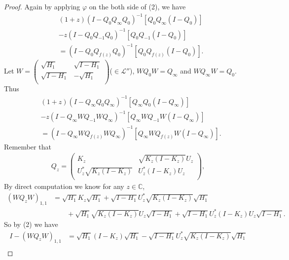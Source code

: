 \documentclass{amsart}
\newcommand{\LLL}{\mathcal L} %
\newcommand{\C}{\mathbb C} %
\begin{document}
\begin{proof}
Again by applying $\varphi$ on the both side of (2), we have
\begin{equation}\label{(*)}
\begin{split}
&(1+z)(I - Q_{0}Q_{\infty}Q_{0})^{-1}[Q_{0}Q_{\infty}(I-Q_{0})] \\
& - z(I - Q_{0}Q_{-1}Q_{0})^{-1}[Q_{0}Q_{-1}(I-Q_{0})] \\
&= (I - Q_{0}Q_{f(z)}Q_{0})^{-1}[Q_{0}Q_{f(z)}(I-Q_{0})].
\end{split}
\end{equation}
Let $W = \left(
           \begin{array}{cc}
             \sqrt{H_1} & \sqrt{I-H_1} \\
             \sqrt{I-H_1} & -\sqrt{H_1} \\
           \end{array}
         \right)$($\in \LLL''$), $WQ_{0}W = Q_{\infty}$ and $WQ_{\infty}W = Q_{0}$. Thus
\begin{equation}\label{(*)}
\begin{split}
&(1+z)(I - Q_{\infty}Q_{0}Q_{\infty})^{-1}[Q_{\infty}Q_{0}(I-Q_{\infty})] \\
& - z(I - Q_{\infty}WQ_{-1}WQ_{\infty})^{-1}[Q_{\infty}WQ_{-1}W(I-Q_{\infty})] \\
&= (I - Q_{\infty}WQ_{f(z)}WQ_{\infty})^{-1}[Q_{\infty}WQ_{f(z)}W(I-Q_{\infty})].
\end{split}
\end{equation}
Remember that
\begin{align*}
Q_{z} = \left(
     \begin{array}{cc}
      K_{z} & \sqrt{K_{z}(I-K_{z})}U_{z} \\
      U_{z}^{*}\sqrt{K_{z}(I-K_{z})} & U_{z}^{*}(I-K_{z})U_{z} \\
  \end{array}
\right),
\end{align*}
By direct computation we know for any $z \in \C$,
\begin{align*}
(WQ_{z}W)_{1,1} &= \sqrt{H_1}K_{z}\sqrt{H_1} + \sqrt{I - H_1}U^{*}_{z}\sqrt{K_{z} (I - K_{z})}\sqrt{H_1} \\
                & \qquad +\sqrt{H_1}\sqrt{K_{z}(I-K_{z})}U_{z}\sqrt{I-H_1} + \sqrt{I-H_1}U^{*}_{z}(I - K_z)U_{z}\sqrt{I - H_1}.
\end{align*}
So by (2) we have
\begin{align*}
I - (WQ_{z}W)_{1,1} &= \sqrt{H_1}(I - K_{z})\sqrt{H_1} - \sqrt{I - H_1}U^{*}_{z}\sqrt{K_{z} (I - K_{z})}\sqrt{H_1} \\

\end{align*}
\end{proof}
\end{document}
